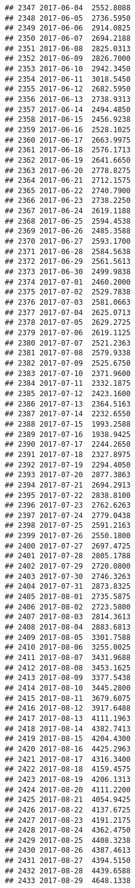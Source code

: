 \documentclass[
]{article}
\begin{document}
\begin{verbatim}
## 2347 2017-06-04  2552.8088
## 2348 2017-06-05  2736.5950
## 2349 2017-06-06  2914.0825
## 2350 2017-06-07  2694.2188
## 2351 2017-06-08  2825.0313
## 2352 2017-06-09  2826.7000
## 2353 2017-06-10  2942.3450
## 2354 2017-06-11  3018.5450
## 2355 2017-06-12  2682.5950
## 2356 2017-06-13  2738.9313
## 2357 2017-06-14  2494.4850
## 2358 2017-06-15  2456.9238
## 2359 2017-06-16  2528.1025
## 2360 2017-06-17  2663.9975
## 2361 2017-06-18  2576.1713
## 2362 2017-06-19  2641.6650
## 2363 2017-06-20  2778.8275
## 2364 2017-06-21  2712.1575
## 2365 2017-06-22  2740.7900
## 2366 2017-06-23  2738.2250
## 2367 2017-06-24  2619.1188
## 2368 2017-06-25  2594.4538
## 2369 2017-06-26  2485.3588
## 2370 2017-06-27  2593.1700
## 2371 2017-06-28  2584.5638
## 2372 2017-06-29  2561.5613
## 2373 2017-06-30  2499.9838
## 2374 2017-07-01  2460.2000
## 2375 2017-07-02  2529.7838
## 2376 2017-07-03  2581.0663
## 2377 2017-07-04  2625.0713
## 2378 2017-07-05  2629.2725
## 2379 2017-07-06  2619.1125
## 2380 2017-07-07  2521.2363
## 2381 2017-07-08  2579.9338
## 2382 2017-07-09  2525.6750
## 2383 2017-07-10  2371.9600
## 2384 2017-07-11  2332.1875
## 2385 2017-07-12  2423.1600
## 2386 2017-07-13  2364.5163
## 2387 2017-07-14  2232.6550
## 2388 2017-07-15  1993.2588
## 2389 2017-07-16  1938.9425
## 2390 2017-07-17  2244.2650
## 2391 2017-07-18  2327.8975
## 2392 2017-07-19  2294.4050
## 2393 2017-07-20  2877.3863
## 2394 2017-07-21  2694.2913
## 2395 2017-07-22  2838.8100
## 2396 2017-07-23  2762.6263
## 2397 2017-07-24  2779.0438
## 2398 2017-07-25  2591.2163
## 2399 2017-07-26  2550.1800
## 2400 2017-07-27  2697.4725
## 2401 2017-07-28  2805.1788
## 2402 2017-07-29  2720.0800
## 2403 2017-07-30  2746.3263
## 2404 2017-07-31  2873.8325
## 2405 2017-08-01  2735.5875
## 2406 2017-08-02  2723.5800
## 2407 2017-08-03  2814.3613
## 2408 2017-08-04  2883.6813
## 2409 2017-08-05  3301.7588
## 2410 2017-08-06  3255.0025
## 2411 2017-08-07  3431.9688
## 2412 2017-08-08  3453.1625
## 2413 2017-08-09  3377.5438
## 2414 2017-08-10  3445.2800
## 2415 2017-08-11  3679.6075
## 2416 2017-08-12  3917.6488
## 2417 2017-08-13  4111.1963
## 2418 2017-08-14  4382.7413
## 2419 2017-08-15  4204.4300
## 2420 2017-08-16  4425.2963
## 2421 2017-08-17  4316.3400
## 2422 2017-08-18  4159.4575
## 2423 2017-08-19  4206.1313
## 2424 2017-08-20  4111.2200
## 2425 2017-08-21  4054.9425
## 2426 2017-08-22  4137.6725
## 2427 2017-08-23  4191.2175
## 2428 2017-08-24  4362.4750
## 2429 2017-08-25  4408.3238
## 2430 2017-08-26  4387.4613
## 2431 2017-08-27  4394.5150
## 2432 2017-08-28  4439.6588
## 2433 2017-08-29  4648.1338

\end{verbatim}
\end{document}
